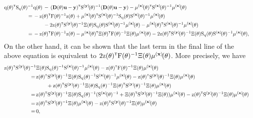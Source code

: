 \begin{align}
        \vcq(\vctheta)^\tr\Sqtheta^{-1}&\vcq(\vctheta)\, - \, (\mathbf{D}(\vctheta)\mathbf{u}-\mathbf{y})^\tr\Sbfytheta^{-1}(\mathbf{D}(\vctheta)\mathbf{u}-\mathbf{y}) - \mubfxtheta^\tr\Sbfxtheta^{-1}\mubfxtheta
        \\
        = \,& -\vcz(\vctheta)^\tr\mxF(\vctheta)^{-1}\vcz(\vctheta) + \mubfxtheta^\tr\Sbfxtheta^{-1}\mxS_{\vcq}(\vctheta)\Sbfxtheta^{-1}\mubfxtheta
        \nonumber\\&\qquad
        - 2\vcz(\vctheta)^\tr\Sbfytheta^{-1}\Xi(\vctheta)\Sqtheta\Sbfxtheta^{-1}\mubfxtheta - \mubfxtheta^\tr\Sbfxtheta^{-1}\mubfxtheta
        \\
        =\,& 
        -\vcz(\vctheta)^\tr\mxF(\vctheta)^{-1}\vcz(\vctheta) - \mubfxtheta^\tr\Xi(\vctheta)^\tr\mxF(\vctheta)^{-1}\Xi(\vctheta)\mubfxtheta - 2\vcz(\vctheta)^\tr\Sbfytheta^{-1}\Xi(\vctheta)\Sqtheta\Sbfxtheta^{-1}\mubfxtheta,
        \label{eq:exponent}
\end{align}        
%
On the other hand, it can be shown that the last term in the final line of the above equation is equivalent to $2\vcz(\vctheta)^\tr\mxF(\vctheta)^{-1}\Xi(\vctheta)\mubfxtheta$. More precisely, we have
\begin{align}
    \vcz(\vctheta)^\tr\Sbfytheta^{-1}
    &
    \Xi(\vctheta) \Sqtheta^{-1} \Sbfxtheta^{-1} \mubfxtheta 
    - 
    \vcz(\vctheta)^\tr \mxF(\vctheta)^{-1} \Xi(\vctheta) \mubfxtheta
    \\
    =\,& 
    \vcz(\vctheta)^\tr 
    \Sbfytheta^{-1} \Xi(\vctheta) \Sqtheta^{-1}\Sbfxtheta^{-1}
    \mubfxtheta 
    - 
    \vcz(\vctheta)^\tr
    \Sbfytheta^{-1}
    \Xi(\vctheta)
    \mubfxtheta
    \nonumber
    \\&
    \qquad
    + \vcz(\vctheta)^\tr\Sbfytheta^{-1}\Xi(\vctheta)\Sqtheta^{-1}\Xi(\vctheta)^\tr\Sbfytheta^{-1}\Xi(\vctheta)\mubfxtheta\\
    =\,& 
    \vcz(\vctheta)^\tr\Sbfytheta^{-1}\Xi(\vctheta)\Sqtheta^{-1}(\Sbfxtheta^{-1} + \Xi(\vctheta)^\tr\Sbfytheta^{-1}\Xi(\vctheta))\mubfxtheta - \vcz(\vctheta)^\tr\Sbfytheta^{-1}\Xi(\vctheta)\mubfxtheta
    \\
    =\,& 
    \vcz(\vctheta)^\tr\Sbfytheta^{-1}\Xi(\vctheta)\mubfxtheta -\vcz(\vctheta)^\tr\Sbfytheta^{-1}\Xi(\vctheta)\mubfxtheta
    \\
    =\,& 0,
\end{align}
